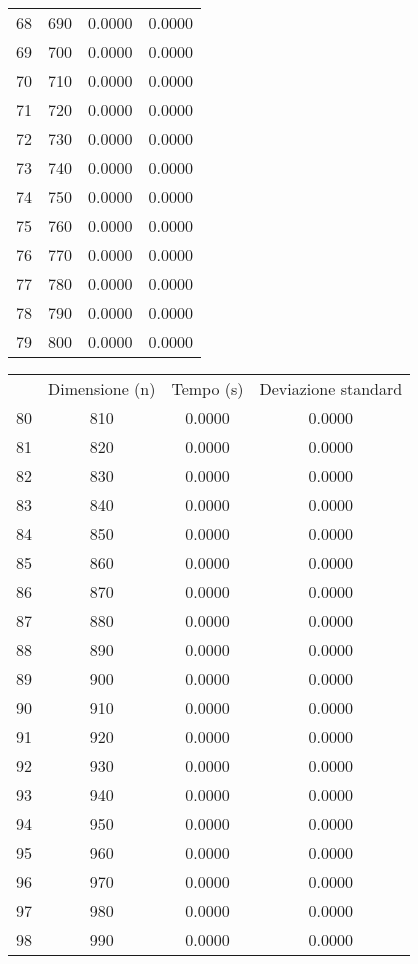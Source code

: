 \begin{table}
\begin{adjustbox}{width=1\textwidth/2}
\begin{tabular}{|c|c|c|c|}
68 & 690 & 0.0000 & 0.0000 \\
\cline{1-4}
69 & 700 & 0.0000 & 0.0000 \\
\cline{1-4}
70 & 710 & 0.0000 & 0.0000 \\
\cline{1-4}
71 & 720 & 0.0000 & 0.0000 \\
\cline{1-4}
72 & 730 & 0.0000 & 0.0000 \\
\cline{1-4}
73 & 740 & 0.0000 & 0.0000 \\
\cline{1-4}
74 & 750 & 0.0000 & 0.0000 \\
\cline{1-4}
75 & 760 & 0.0000 & 0.0000 \\
\cline{1-4}
76 & 770 & 0.0000 & 0.0000 \\
\cline{1-4}
77 & 780 & 0.0000 & 0.0000 \\
\cline{1-4}
78 & 790 & 0.0000 & 0.0000 \\
\cline{1-4}
79 & 800 & 0.0000 & 0.0000 \\
\cline{1-4}
\end{tabular}
\end{adjustbox}
\end{table}

\begin{table}
\centering
\begin{adjustbox}{width=1\textwidth/2}
\begin{tabular}{|c|c|c|c|}
\hline
 & Dimensione (n) & Tempo (s) & Deviazione standard \\
80 & 810 & 0.0000 & 0.0000 \\
\cline{1-4}
81 & 820 & 0.0000 & 0.0000 \\
\cline{1-4}
82 & 830 & 0.0000 & 0.0000 \\
\cline{1-4}
83 & 840 & 0.0000 & 0.0000 \\
\cline{1-4}
84 & 850 & 0.0000 & 0.0000 \\
\cline{1-4}
85 & 860 & 0.0000 & 0.0000 \\
\cline{1-4}
86 & 870 & 0.0000 & 0.0000 \\
\cline{1-4}
87 & 880 & 0.0000 & 0.0000 \\
\cline{1-4}
88 & 890 & 0.0000 & 0.0000 \\
\cline{1-4}
89 & 900 & 0.0000 & 0.0000 \\
\cline{1-4}
90 & 910 & 0.0000 & 0.0000 \\
\cline{1-4}
91 & 920 & 0.0000 & 0.0000 \\
\cline{1-4}
92 & 930 & 0.0000 & 0.0000 \\
\cline{1-4}
93 & 940 & 0.0000 & 0.0000 \\
\cline{1-4}
94 & 950 & 0.0000 & 0.0000 \\
\cline{1-4}
95 & 960 & 0.0000 & 0.0000 \\
\cline{1-4}
96 & 970 & 0.0000 & 0.0000 \\
\cline{1-4}
97 & 980 & 0.0000 & 0.0000 \\
\cline{1-4}
98 & 990 & 0.0000 & 0.0000 \\
\cline{1-4}
\end{tabular}
\end{adjustbox}
\end{table}
